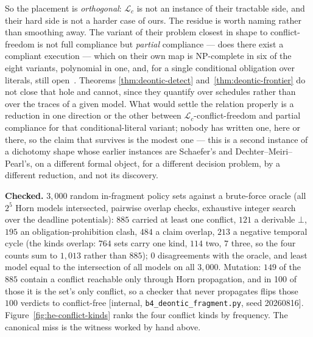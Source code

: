 \documentclass[11pt,a4paper]{article}
\theoremstyle{definition}
\theoremstyle{definition}
\theoremstyle{remark}
\begin{document}
So the placement is \emph{orthogonal}: $\mathcal{L}_c$ is not an instance of
their tractable side, and their hard side is not a harder case of ours. The
residue is worth naming rather than smoothing away. The variant of their problem
closest in shape to conflict-freedom is not full compliance but \emph{partial}
compliance --- does there exist a compliant execution --- which on their own map
is NP-complete in six of the eight variants, polynomial in one, and, for a single
conditional obligation over literals, still open~. Theorems
\ref{thm:deontic-detect} and~\ref{thm:deontic-frontier} do not close that hole
and cannot, since they quantify over schedules rather than over the traces of a
given model. What would settle the relation properly is a reduction in one
direction or the other between $\mathcal{L}_c$-conflict-freedom and partial
compliance for that conditional-literal variant; nobody has written one, here or
there, so the claim that survives is the modest one --- this is a second
instance of a dichotomy shape whose earlier instances are Schaefer's and
Dechter--Meiri--Pearl's, on a different formal object, for a different decision
problem, by a different reduction, and not its discovery.

\noindent\textbf{Checked.} $3{,}000$ random in-fragment policy sets against a
brute-force oracle (all $2^5$ Horn models intersected, pairwise overlap checks,
exhaustive integer search over the deadline potentials): $885$ carried at least
one conflict, $121$ a derivable $\bot$, $195$ an obligation-prohibition clash,
$484$ a claim overlap, $213$ a negative temporal cycle (the kinds overlap: $764$
sets carry one kind, $114$ two, $7$ three, so the four counts sum to $1{,}013$
rather than $885$); $0$ disagreements with the oracle, and least model equal to
the intersection of all models on all $3{,}000$. Mutation: $149$ of the $885$
contain a conflict reachable only through Horn propagation, and in 100 of
those it is the set's only conflict, so a checker that never propagates flips
those $100$ verdicts to conflict-free [internal,
\texttt{b4\_deontic\_fragment.py}, seed 20260816]. Figure~\ref{fig:he-conflict-kinds}
ranks the four conflict kinds by frequency. The canonical miss is the
witness worked by hand above.


\end{document}
